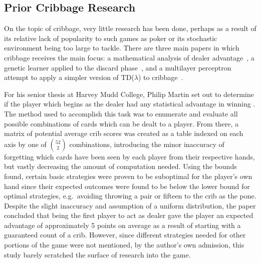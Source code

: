 
\subsection{Prior Cribbage Research}


On the topic of cribbage, very little research has been done,
perhaps as a result of its relative lack of popularity to such games as poker
or its stochastic environment being too large to tackle.
%
There are three main papers in which cribbage receives the main focus:
a mathematical analysis of dealer advantage~\cite{cribbage_optimal_ev},
a genetic learner applied to the discard phase~\cite{adaptive_cribbage},
and a multilayer perceptron attempt to apply a simpler version of TD($\lambda$)
to cribbage~\cite{roconnor_cs486}.

For his senior thesis at Harvey Mudd College,
Philip Martin set out to determine if the player which begins as the dealer
had any statistical advantage in winning
\cite{cribbage_optimal_ev}.
%
The method used to accomplish this task was to enumerate and evaluate all
possible combinations of cards which can be dealt to a player.
%
From there,
a matrix of potential average crib scores was created as a table indexed on each
axis by one of ${52 \choose 2}$ combinations,
introducing the minor inaccuracy of forgetting which cards have been seen by each
player from their respective hands,
but vastly decreasing the amount of computation needed.
%
Using the bounds found,
certain basic strategies were proven to be suboptimal for the player's own hand
since their expected outcomes
were found to be below the lower bound for optimal strategies,
e.g.\  avoiding throwing a pair or fifteen to the crib as the pone.
%
Despite the slight inaccuracy and assumption of a uniform distribution,
the paper concluded that being the first player to act as dealer gave the
player an expected advantage of approximately 5 points on average
as a result of starting with a guaranteed count of a crib.
%
However,
since different strategies needed for other portions of the game were not
mentioned,
by the author's own admission, this study barely scratched the surface of
research into the game.

